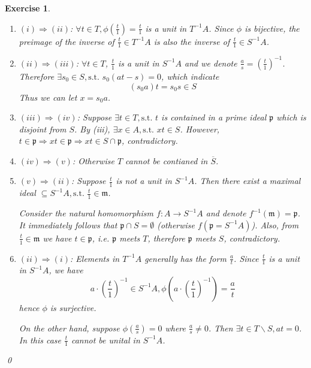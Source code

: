 \documentclass{article}
\theoremstyle{breakstyle}
\newtheorem{exercise}{Exercise}
\begin{document}
\begin{exercise}
    \leavevmode \vspace{-\baselineskip}
    \begin{enumerate}[label=({\Roman*})]
        \item $(i)\Rightarrow(ii)$:
            $\forall t\in T,\phi(\frac{t}{1})=\frac{t}{1}$ is a unit in $T^{-1}A$.
            Since $\phi$ is bijective, the preimage of the inverse of $\frac{t}{1}\in T^{-1}A$ is also the inverse of $\frac{t}{1}\in S^{-1}A$.
        \item $(ii)\Rightarrow(iii)$:
            $\forall t\in T$, $\frac{t}{1}$ is a unit in $S^{-1}A$ and we denote $\frac{a}{s}=\left( \frac{t}{1} \right) ^{-1}$.
            Therefore $\exists s_0\in S,\text{s.t. }s_0(at-s)=0$,
            which indicate
            $$
            \left( s_0a \right) t=s_0s \in S
            $$
            Thus we can let $x=s_0a$.
        \item $(iii)\Rightarrow(iv)$:
            Suppose $\exists t\in T,\text{s.t. }t$ is contained in a prime ideal $\mathfrak{p}$ which is disjoint from $S$.
            By \emph{(iii)}, $\exists x\in A,\text{s.t. }xt\in S$.
            However, $t\in \mathfrak{p}\Rightarrow xt\in \mathfrak{p}\Rightarrow xt \in S\cap \mathfrak{p}$, contradictory.
        \item $(iv)\Rightarrow (v)$:
            Otherwise $T$ cannot be contianed in $\overline{S}$.
        \item $(v)\Rightarrow (ii)$:
            Suppose $\frac{t}{1}$ is not a unit in $S^{-1}A$.
            Then there exist a maximal ideal $\mathfrak\subseteq S^{-1}A,\text{s.t. }\frac{t}{1}\in \mathfrak{m}$.

            Consider the natural homomorphism $f:A\longrightarrow S^{-1}A$ and denote $f^{-1}(\mathfrak{m})=\mathfrak{p}$.
            It immediately follows that $\mathfrak{p}\cap S=\emptyset$ (otherwise $f(\mathfrak{p}=S^{-1}A)$).
            Also, from $\frac{t}{1}\in \mathfrak{m}$ we have $t\in \mathfrak{p}$, i.e. $\mathfrak{p}$ meets $T$, therefore $\mathfrak{p}$ meets $S$, contradictory.
        \item $(ii)\Rightarrow (i)$:
            Elements in $T^{-1}A$ generally has the form $\frac{a}{t}$.
            Since $\frac{t}{1}$ is a unit in $S^{-1}A$, we have
            $$
            a\cdot \left( \frac{t}{1} \right) ^{-1}\in S^{-1}A,\phi\left( a\cdot \left( \frac{t}{1} \right) ^{-1} \right) =\frac{a}{t}
            $$
            hence $\phi$ is surjective.

            On the other hand, suppose $\phi\left( \frac{a}{s} \right) =0$ where $\frac{a}{s}\neq 0$.
            Then $\exists t\in T\backslash S,at=0$.
            In this case $\frac{t}{1}$ cannot be unital in $S^{-1}A$.
    \end{enumerate}
    \qed
\end{exercise}
\end{document}
